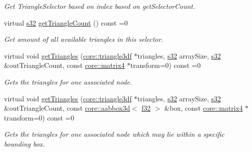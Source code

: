 \begin{DoxyCompactItemize}
\begin{DoxyCompactList}\small\item\em Get Triangle\+Selector based on index based on get\+Selector\+Count. \end{DoxyCompactList}\item 
\mbox{\label{classirr_1_1scene_1_1ITriangleSelector_a0db5d5c5c9df15c41c00db40c692fcc6}} 
virtual \hyperlink{namespaceirr_ac66849b7a6ed16e30ebede579f9b47c6}{s32} \hyperlink{classirr_1_1scene_1_1ITriangleSelector_a0db5d5c5c9df15c41c00db40c692fcc6}{get\+Triangle\+Count} () const =0
\begin{DoxyCompactList}\small\item\em Get amount of all available triangles in this selector. \end{DoxyCompactList}\item 
virtual void \hyperlink{classirr_1_1scene_1_1ITriangleSelector_a63b547218902d57a44357d3a246e5070}{get\+Triangles} (\hyperlink{namespaceirr_1_1core_a8983bda2678a7a67d97bf3c7be6c31c7}{core\+::triangle3df} $\ast$triangles, \hyperlink{namespaceirr_ac66849b7a6ed16e30ebede579f9b47c6}{s32} array\+Size, \hyperlink{namespaceirr_ac66849b7a6ed16e30ebede579f9b47c6}{s32} \&out\+Triangle\+Count, const \hyperlink{namespaceirr_1_1core_a4c9d4e29899535971052810954a14431}{core\+::matrix4} $\ast$transform=0) const =0
\begin{DoxyCompactList}\small\item\em Gets the triangles for one associated node. \end{DoxyCompactList}\item 
virtual void \hyperlink{classirr_1_1scene_1_1ITriangleSelector_aa0bd1a2f9b429fcf7ff2ce4d6c7acd50}{get\+Triangles} (\hyperlink{namespaceirr_1_1core_a8983bda2678a7a67d97bf3c7be6c31c7}{core\+::triangle3df} $\ast$triangles, \hyperlink{namespaceirr_ac66849b7a6ed16e30ebede579f9b47c6}{s32} array\+Size, \hyperlink{namespaceirr_ac66849b7a6ed16e30ebede579f9b47c6}{s32} \&out\+Triangle\+Count, const \hyperlink{classirr_1_1core_1_1aabbox3d}{core\+::aabbox3d}$<$ \hyperlink{namespaceirr_a0277be98d67dc26ff93b1a6a1d086b07}{f32} $>$ \&box, const \hyperlink{namespaceirr_1_1core_a4c9d4e29899535971052810954a14431}{core\+::matrix4} $\ast$transform=0) const =0
\begin{DoxyCompactList}\small\item\em Gets the triangles for one associated node which may lie within a specific bounding box. \end{DoxyCompactList}\item 

\end{DoxyCompactItemize}
